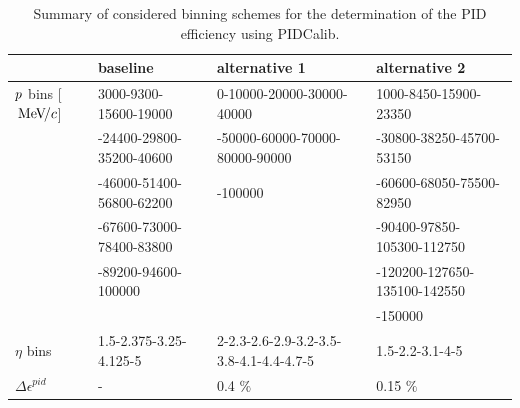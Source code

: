 \begin{table}[h]
\centering
\begin{tabular}{l l l l}
 & baseline & alternative 1 & alternative 2\\
\hline
$\mbox{$p$}$ bins [${\mathrm{\,Me\kern -0.1em V\!/}c}$] & \scriptsize 3000-9300-15600-19000&\scriptsize 0-10000-20000-30000-40000&\scriptsize 1000-8450-15900-23350\\&\scriptsize-24400-29800-35200-40600&\scriptsize-50000-60000-70000-80000-90000&\scriptsize-30800-38250-45700-53150\\&\scriptsize-46000-51400-56800-62200&\scriptsize-100000&\scriptsize-60600-68050-75500-82950\\&\scriptsize-67600-73000-78400-83800&&\scriptsize-90400-97850-105300-112750\\&\scriptsize-89200-94600-100000&&\scriptsize-120200-127650-135100-142550\\&&&\scriptsize-150000\normalsize\\
\hline
$\eta$ bins  &\scriptsize 1.5-2.375-3.25-4.125-5 &\scriptsize 2-2.3-2.6-2.9-3.2-3.5-3.8-4.1-4.4-4.7-5 & \scriptsize 1.5-2.2-3.1-4-5\normalsize\\
\hline \hline
$\Delta\epsilon^{pid}$      & - & 0.4 $\%$ & 0.15 $\%$\\
\end{tabular}
\caption{Summary of considered binning schemes for the determination of the PID efficiency using PIDCalib.}
\label{tab: PIDbinning}
\end{table}


